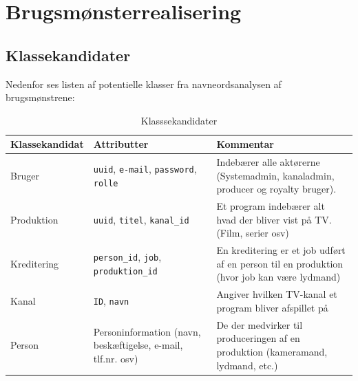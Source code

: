 \section{Brugsmønsterrealisering}

\subsection{Klassekandidater}
Nedenfor ses listen af potentielle klasser fra navneordsanalysen af brugsmønstrene:
\begin{table}[h]
    \centering
    \begin{tabular}{|p{4cm}|p{4cm}|p{8cm}|}
        \hline
        \textbf{Klassekandidat} & \textbf{Attributter} & \textbf{Kommentar} \\
        \hline
        Bruger & \texttt{uuid}, \texttt{e-mail}, \texttt{password}, \texttt{rolle} & Indebærer alle aktørerne (Systemadmin, kanaladmin, producer og royalty bruger).\\
        \hline
        Produktion & \texttt{uuid}, \texttt{titel}, \texttt{kanal\_id} & Et program indebærer alt hvad der bliver vist på TV. (Film, serier osv) \\
        \hline
        Kreditering & \texttt{person\_id}, \texttt{job}, \texttt{produktion\_id} & En kreditering er et job udført af en person til en produktion (hvor job kan være lydmand) \\
        \hline
        Kanal & \texttt{ID}, \texttt{navn} & Angiver hvilken TV-kanal et program bliver afspillet på\\
        \hline
        Person & Personinformation (navn, beskæftigelse, e-mail, tlf.nr. osv)  & De der medvirker til produceringen af en produktion (kameramand, lydmand, etc.)\\
        \hline
    \end{tabular}
    \caption{Klasssekandidater}
    \label{table:class_candidates}
\end{table}

